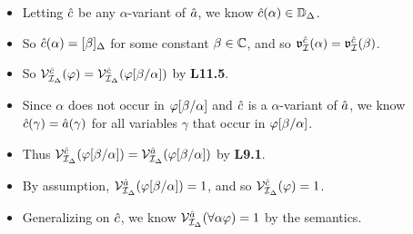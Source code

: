 \documentclass[a4paper, 11pt]{article} %
\begin{document}
\begin{itemize}
    \item Letting $\hat{c}$ be any $\alpha$-variant of $\hat{a}$, we know $\hat{c}(\alpha)\in\mathbb{D}_{\Delta}$.
    \item So $\hat{c}(\alpha)=[\beta]_{\Delta}$ for some constant $\beta\in\mathbb{C}$, and so $\mathfrak{v}_{\mathcal{I}}^{\hat{c}}(\alpha)=\mathfrak{v}_{\mathcal{I}}^{\hat{c}}(\beta)$.
    \item So $\mathcal{V}_{\mathcal{I}_{\Delta}}^{\hat{c}}(\varphi)=\mathcal{V}_{\mathcal{I}_{\Delta}}^{\hat{c}}(\varphi[\beta/\alpha])$ by \textbf{L11.5}.
    \item Since $\alpha$ does not occur in $\varphi[\beta/\alpha]$ and $\hat{c}$ is a $\alpha$-variant of $\hat{a}$, we know $\hat{c}(\gamma) = \hat{a}(\gamma)$ for all variables $\gamma$ that occur in $\varphi[\beta/\alpha]$.
    \item Thus $\mathcal{V}_{\mathcal{I}_{\Delta}}^{\hat{c}}(\varphi[\beta/\alpha]) = \mathcal{V}_{\mathcal{I}_{\Delta}}^{\hat{a}}(\varphi[\beta/\alpha])$ by \textbf{L9.1}.
    \item By assumption, $\mathcal{V}_{\mathcal{I}_{\Delta}}^{\hat{a}}(\varphi[\beta/\alpha]) = 1$, and so $\mathcal{V}_{\mathcal{I}_{\Delta}}^{\hat{c}}(\varphi) = 1$.
    \item Generalizing on $\hat{c}$, we know $\mathcal{V}_{\mathcal{I}_{\Delta}}^{\hat{a}}(\forall \alpha\varphi)=1$ by the semantics. 


\end{itemize}
\end{document}
